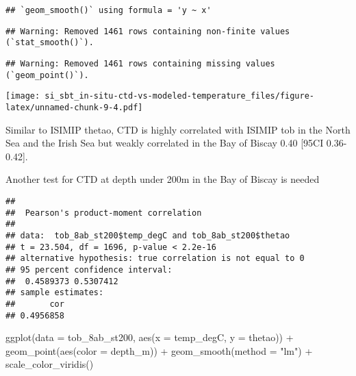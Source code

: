 \documentclass[
]{article}
\newenvironment{Shaded}{\begin{snugshade}}{\end{snugshade}}
\newcommand{\AttributeTok}[1]{\textcolor[rgb]{0.77,0.63,0.00}{#1}}
\newcommand{\CommentTok}[1]{\textcolor[rgb]{0.56,0.35,0.01}{\textit{#1}}}
\newcommand{\DecValTok}[1]{\textcolor[rgb]{0.00,0.00,0.81}{#1}}
\newcommand{\FunctionTok}[1]{\textcolor[rgb]{0.00,0.00,0.00}{#1}}
\newcommand{\NormalTok}[1]{#1}
\newcommand{\OtherTok}[1]{\textcolor[rgb]{0.56,0.35,0.01}{#1}}
\newcommand{\SpecialCharTok}[1]{\textcolor[rgb]{0.00,0.00,0.00}{#1}}
\newcommand{\StringTok}[1]{\textcolor[rgb]{0.31,0.60,0.02}{#1}}
\begin{document}
\begin{verbatim}
## `geom_smooth()` using formula = 'y ~ x'
\end{verbatim}

\begin{verbatim}
## Warning: Removed 1461 rows containing non-finite values (`stat_smooth()`).
\end{verbatim}

\begin{verbatim}
## Warning: Removed 1461 rows containing missing values (`geom_point()`).
\end{verbatim}

\texttt{[image: si\_sbt\_in-situ-ctd-vs-modeled-temperature\_files/figure-latex/unnamed-chunk-9-4.pdf]}

Similar to ISIMIP thetao, CTD is highly correlated with ISIMIP tob in
the North Sea and the Irish Sea but weakly correlated in the Bay of
Biscay 0.40 {[}95CI 0.36-0.42{]}.

Another test for CTD at depth under 200m in the Bay of Biscay is needed

\begin{Shaded}
\end{Shaded}

\begin{verbatim}
## 
##  Pearson's product-moment correlation
## 
## data:  tob_8ab_st200$temp_degC and tob_8ab_st200$thetao
## t = 23.504, df = 1696, p-value < 2.2e-16
## alternative hypothesis: true correlation is not equal to 0
## 95 percent confidence interval:
##  0.4589373 0.5307412
## sample estimates:
##       cor 
## 0.4956858
\end{verbatim}

\begin{Shaded}
\begin{Highlighting}[]
\FunctionTok{ggplot}\NormalTok{(}\AttributeTok{data =}\NormalTok{ tob\_8ab\_st200, }\FunctionTok{aes}\NormalTok{(}\AttributeTok{x =}\NormalTok{ temp\_degC, }\AttributeTok{y =}\NormalTok{ thetao)) }\SpecialCharTok{+} \FunctionTok{geom\_point}\NormalTok{(}\FunctionTok{aes}\NormalTok{(}\AttributeTok{color =}\NormalTok{ depth\_m)) }\SpecialCharTok{+} \FunctionTok{geom\_smooth}\NormalTok{(}\AttributeTok{method =} \StringTok{"lm"}\NormalTok{) }\SpecialCharTok{+} \FunctionTok{scale\_color\_viridis}\NormalTok{()}
\end{Highlighting}
\end{Shaded}
\end{document}
